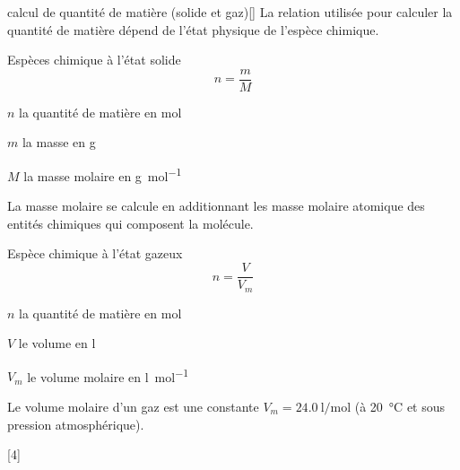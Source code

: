 \begin{doc}{calcul de quantité de matière (solide et gaz)}[\label{doc:calcul_mole_sol_gaz}]
  La relation utilisée pour calculer la quantité de matière dépend de l'état physique de l'espèce chimique.
  \begin{multicols}{2}
    Espèces chimique à l'état solide
    \begin{equation*}
      n = \dfrac{m}{M}
    \end{equation*}
    \begin{listePoints}
      \item $n$ la quantité de matière en \unit{\mole}
      \item $m$ la masse en \unit{\g}
      \item $M$ la masse molaire en \unit{\g\per\mole}
    \end{listePoints}
    La masse molaire se calcule en additionnant les masse molaire atomique des entités chimiques qui composent la molécule.
    
    Espèce chimique à l'état gazeux
    \begin{equation*}
      n = \dfrac{V}{V_m}
    \end{equation*}
    \begin{listePoints}
      \item $n$ la quantité de matière en \unit{\mole}
      \item $V$ le volume en \unit{\litre}
      \item $V_m$ le volume molaire en \unit{\litre\per\mole}
    \end{listePoints}
    Le volume molaire d'un gaz est une constante $V_m = \qty{24,0}{\litre\per\mole}$ (à \qty{20}{\degreeCelsius} et sous pression atmosphérique).
  \end{multicols}
\end{doc}

[4]



